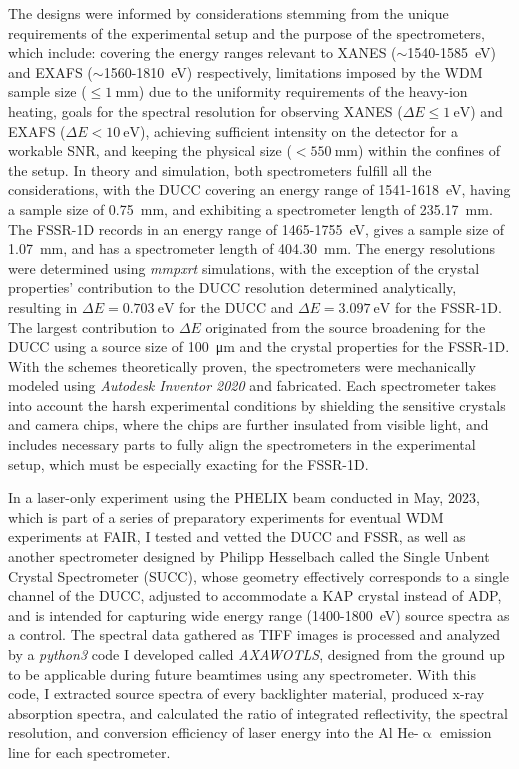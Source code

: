 The designs were informed 
by considerations stemming from the unique requirements of the experimental setup and the purpose of the spectrometers, which include: 
covering the energy ranges relevant to XANES ($\sim$1540-\SI{1585}{\electronvolt}) and 
EXAFS ($\sim$1560-\SI{1810}{\electronvolt}) respectively, limitations imposed by the WDM 
sample size ($\leq\SI{1}{\milli\meter}$) due to the uniformity requirements of the 
heavy-ion heating, goals for the spectral 
resolution for observing XANES ($\Delta E\leq\SI{1}{\electronvolt}$) and EXAFS ($\Delta E<\SI{10}{\electronvolt}$), achieving 
sufficient intensity on the detector for a workable SNR, and keeping the 
physical size ($<\SI{550}{\milli\meter}$) within the confines of the setup. In theory and simulation, both 
spectrometers fulfill all the considerations, with 
the DUCC covering an energy range of 
1541-\SI{1618}{\electronvolt}, having a sample size of 
\SI{0.75}{\milli\meter}, and exhibiting a spectrometer length of 
\SI{235.17}{\milli\meter}. The FSSR-1D records in an 
energy range of 1465-\SI{1755}{\electronvolt}, gives a 
sample size of \SI{1.07}{\milli\meter}, and has a spectrometer 
length of \SI{404.30}{\milli\meter}. The energy 
resolutions were 
determined using \textit{mmpxrt} simulations, with the exception of the crystal properties' 
contribution to the DUCC resolution determined analytically, resulting in $\Delta E = 
\SI{0.703}{\electronvolt}$ for the DUCC 
and $\Delta E = \SI{3.097}{\electronvolt}$ for 
the 
FSSR-1D. The largest contribution to $\Delta E$ originated from the source broadening for 
the DUCC using a source size of \SI{100}{\micro\meter} and the crystal properties for the FSSR-1D. With the schemes theoretically proven, the spectrometers were mechanically modeled using 
\textit{Autodesk Inventor 2020} and fabricated. Each spectrometer 
takes into account the harsh experimental conditions by 
shielding the sensitive crystals and camera chips, 
where the chips are further insulated from visible 
light, and includes necessary parts to fully 
align the spectrometers in the experimental setup, 
which must be especially exacting for the FSSR-1D.

In a laser-only experiment using the PHELIX beam conducted in May, 2023, which is part of a series of preparatory experiments for eventual WDM experiments at FAIR, I tested and vetted the DUCC and FSSR, as well as another spectrometer designed by Philipp Hesselbach called the Single Unbent Crystal Spectrometer (SUCC), whose geometry effectively corresponds to a single channel of the DUCC, adjusted to accommodate a KAP crystal instead of ADP, and is intended for capturing wide energy range (1400-\SI{1800}{\electronvolt}) source spectra as a control. The spectral data gathered as TIFF images is processed and analyzed by a \textit{python3} code I developed called \textit{AXAWOTLS}, designed from the ground up to be applicable during future beamtimes using any spectrometer. With this code, I extracted source spectra of every backlighter material, produced x-ray absorption spectra, and calculated the ratio of integrated reflectivity, the spectral resolution, and conversion efficiency of laser energy into the Al He-$\upalpha$ emission line for each spectrometer.

